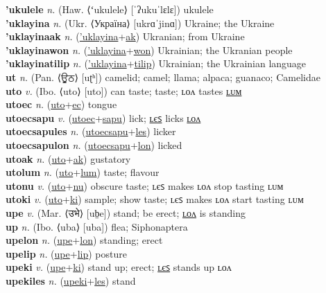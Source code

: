 \textbf{'ukulele} \textit{n.} (Haw. ⟨ʻukulele⟩ [ˈʔukuˈlɛlɛ])
ukulele \label{'ukulele} \\
\textbf{'uklayina} \textit{n.} (Ukr. ⟨Україна⟩ [ukrɑˈjinɑ])
Ukraine; the Ukraine \label{'uklayina} \\
\textbf{'uklayinaak} \textit{n.} (\hyperref['uklayina]{'uklayina}+\hyperref[ak]{ak})
Ukranian; from Ukraine \label{'uklayinaak} \\
\textbf{'uklayinawon} \textit{n.} (\hyperref['uklayina]{'uklayina}+\hyperref[won]{won})
Ukrainian; the Ukranian people \label{'uklayinawon} \\
\textbf{'uklayinatilip} \textit{n.} (\hyperref['uklayina]{'uklayina}+\hyperref[tilip]{tilip})
Ukrainian; the Ukrainian language \label{'uklayinatilip} \\
\textbf{ut} \textit{n.} (Pan. ⟨ਊਠ⟩ [uʈʰ])
camelid; camel; llama; alpaca; guanaco; Camelidae \label{ut} \\
\textbf{uto} \textit{v.} (Ibo. ⟨uto⟩ [uto])
can taste; taste; ʟᴏᴧ tastes \hyperref[utolum]{ʟᴜᴍ} \label{uto} \\
\textbf{utoec} \textit{n.} (\hyperref[uto]{uto}+\hyperref[ec]{ec})
tongue \label{utoec} \\
\textbf{utoecsapu} \textit{v.} (\hyperref[utoec]{utoec}+\hyperref[sapu]{sapu})
lick; \hyperref[utoecsapules]{ʟєꜱ} licks \hyperref[utoecsapulon]{ʟᴏᴧ} \label{utoecsapu} \\
\textbf{utoecsapules} \textit{n.} (\hyperref[utoecsapu]{utoecsapu}+\hyperref[les]{les})
licker \label{utoecsapules} \\
\textbf{utoecsapulon} \textit{n.} (\hyperref[utoecsapu]{utoecsapu}+\hyperref[lon]{lon})
licked \label{utoecsapulon} \\
\textbf{utoak} \textit{n.} (\hyperref[uto]{uto}+\hyperref[ak]{ak})
gustatory \label{utoak} \\
\textbf{utolum} \textit{n.} (\hyperref[uto]{uto}+\hyperref[lum]{lum})
taste; flavour \label{utolum} \\
\textbf{utonu} \textit{v.} (\hyperref[uto]{uto}+\hyperref[nu]{nu})
obscure taste; ʟєꜱ makes ʟᴏᴧ stop tasting ʟᴜᴍ \label{utonu} \\
\textbf{utoki} \textit{v.} (\hyperref[uto]{uto}+\hyperref[ki]{ki})
sample; show taste; ʟєꜱ makes ʟᴏᴧ start tasting ʟᴜᴍ \label{utoki} \\
\textbf{upe} \textit{v.} (Mar. ⟨उभे⟩ [ub̤e])
stand; be erect; \hyperref[upelon]{ʟᴏᴧ} is standing \label{upe} \\
\textbf{up} \textit{n.} (Ibo. ⟨uba⟩ [uba])
flea; Siphonaptera \label{up} \\
\textbf{upelon} \textit{n.} (\hyperref[upe]{upe}+\hyperref[lon]{lon})
standing; erect \label{upelon} \\
\textbf{upelip} \textit{n.} (\hyperref[upe]{upe}+\hyperref[lip]{lip})
posture \label{upelip} \\
\textbf{upeki} \textit{v.} (\hyperref[upe]{upe}+\hyperref[ki]{ki})
stand up; erect; \hyperref[upekiles]{ʟєꜱ} stands up ʟᴏᴧ \label{upeki} \\
\textbf{upekiles} \textit{n.} (\hyperref[upeki]{upeki}+\hyperref[les]{les})
stand \label{upekiles} \\
